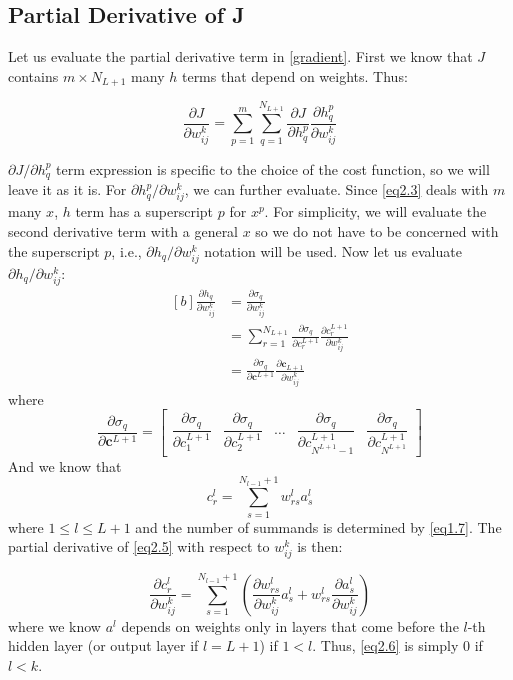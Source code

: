 \documentclass[letterpaper, 11pt]{article}
\newcommand{\pd}[2]{\frac{\partial#1}{\partial#2}}
\newcommand{\w}{w^{k}_{ij}}
\newcommand{\bpd}[2]{\dfrac{\partial#1}{\partial#2}}
\numberwithin{equation}{section}
\numberwithin{figure}{section}
\numberwithin{table}{section}
\begin{document}
\subsection{Partial Derivative of J}
Let us evaluate the partial derivative term in \ref{gradient}. First we know that \(J\) contains \(m \times N_{L+1}\) many \(h\) terms that depend on weights. Thus:

\begin{equation}
	\pd{J}{\w} = \sum_{p=1}^{m}\sum_{q=1}^{N_{L+1}} \pd{J}{h^{p}_{q}}\pd{h^{p}_{q}}{\w}\label{eq2.3}
\end{equation}

\(\partial{J}/\partial{h^{p}_{q}}\) term expression is specific to the choice of the cost function, so we will leave it as it is. For \(\partial{h^{p}_{q}}/\partial{\w}\), we can further evaluate. Since \ref{eq2.3} deals with \(m\) many \(x\), \(h\) term has a superscript \(p\) for \(x^{p}\).  For simplicity, we will evaluate the second derivative term with a general \(x\) so we do not have to be concerned with the superscript \(p\), i.e., \(\partial{h_{q}}/\partial{\w}\) notation will be used. Now let us evaluate \(\partial{h_{q}}/\partial{\w}\):
\begin{equation}
	\begin{aligned}[b]
		\pd{h_{q}}{\w} 
		&= \pd{\sigma_{q}}{\w} \\ 
		&= \sum_{r=1}^{N_{L+1}}\pd{\sigma_{q}}{c^{L+1}_{r}}\pd{c^{L+1}_{r}}{\w}\\
		&= \pd{\sigma_{q}}{\textbf{c}^{L+1}}\pd{\textbf{c}_{L+1}}{\w}\label{eq2.4}
	\end{aligned}
\end{equation}
where 
\begin{equation}
	\pd{\sigma_{q}}{\textbf{c}^{L+1}} = 
		\begin{bmatrix}
			\bpd{\sigma_{q}}{c^{L+1}_{1}}&
			\bpd{\sigma_{q}}{c^{L+1}_{2}}&
			\hdots&
			\bpd{\sigma_{q}}{c^{L+1}_{N^{L+1}-1}}&
			\bpd{\sigma_{q}}{c^{L+1}_{N^{L+1}}}
		\end{bmatrix}
\end{equation}
And we know that 
\begin{equation}
		c^{l}_{r}
		= \sum_{s=1}^{N_{l-1}+1}w^{l}_{rs}a^{l}_{s}\label{eq2.5}
\end{equation}
where \(1 \le l \le L+1\) and the number of summands is determined by \ref{eq1.7}. The partial derivative of \ref{eq2.5} with respect to \(\w\) is then:

\begin{equation}
	\pd{c^{l}_{r}}{\w}
	= \sum_{s=1}^{N_{l-1}+1}(\pd{w^{l}_{rs}}{\w}a^{l}_{s}+w^{l}_{rs}\pd{a^{l}_{s}}{\w})\label{eq2.6}
\end{equation}
where we know \(a^{l}\) depends on weights only in layers that come before the \(l\)-th hidden layer (or output layer if \(l = L+1\)) if \(1 < l\). Thus, \ref{eq2.6} is simply 0 if \(l < k\). 
\end{document}
